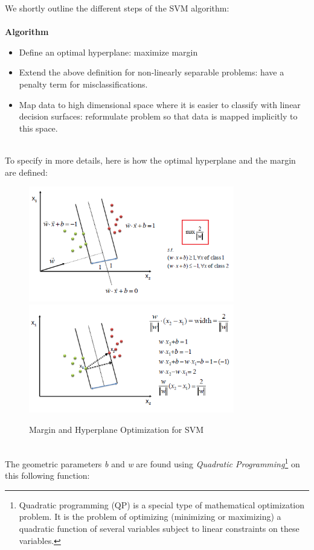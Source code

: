 We shortly outline the different steps of the SVM algorithm:
\\
\\
\textbf{Algorithm}
\begin{itemize}
  \item Define an optimal hyperplane: maximize margin
  \item Extend the above definition for non-linearly separable problems: have a penalty term for misclassifications.
  \item Map data to high dimensional space where it is easier to classify with linear decision surfaces: reformulate problem so that data is mapped implicitly to this space.
\end{itemize} 
\\
To specify in more details, here is how the optimal hyperplane and the margin are defined:
\\
\begin{figure}[H]
    \centering
    \includegraphics[width=0.8\textwidth]{fig/hypopt1.png}
    \includegraphics[width=0.8\textwidth]{fig/hypopt2.png}
    \caption[Short caption]{Margin and Hyperplane Optimization for SVM}
    \label{fig:hypopt}
\end{figure}
\\
The geometric parameters \emph{b} and \emph{w} are found using \emph{Quadratic Programming}\footnote{Quadratic programming (QP) is a special type of mathematical optimization problem. It is the problem of optimizing (minimizing or maximizing) a quadratic function of several variables subject to linear constraints on these variables.} on this following function:
